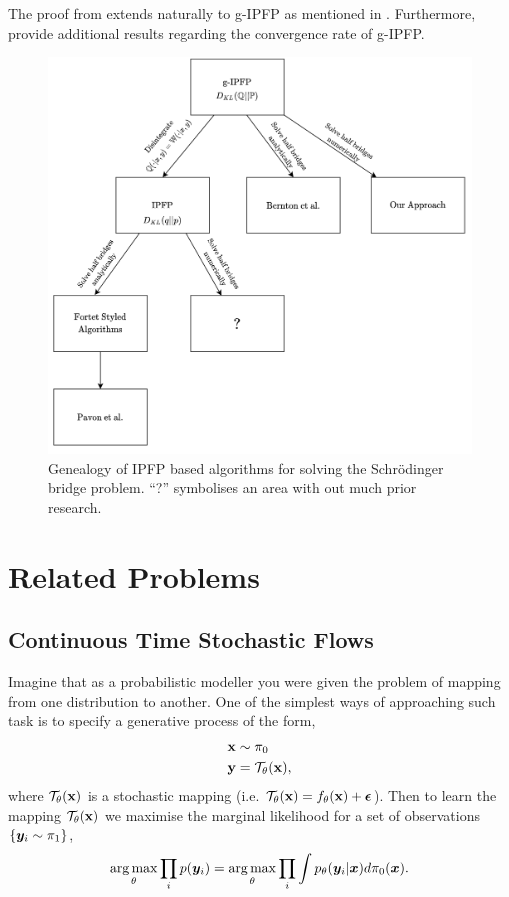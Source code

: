 \documentclass[a4paper,12pt,twoside,openright]{report}
\theoremstyle{definition}
\begin{document}
The proof from \cite{ruschendorf1995convergence} extends naturally to g-IPFP as mentioned in \cite{bernton2019schr}. Furthermore, \cite{bernton2019schr} provide additional results regarding the convergence rate of g-IPFP.
\begin{figure}[h!]
    \centering
    \includegraphics[width=\linewidth]{images/IPFP_Geanology.png}
    \caption{Genealogy of IPFP based algorithms for solving the Schrödinger bridge problem. ``?'' symbolises an area with out much prior research. }
    \label{fig:genealogy}
\end{figure}

\chapter{Related Problems}
\section{Continuous Time Stochastic Flows}

Imagine that as a probabilistic modeller you were given the problem of mapping from one distribution to another. One of the simplest ways of approaching such task is to specify a generative process of the form,
\begin{align*}
    {\mathbf{x}} &\sim \pi_0 \\
    {\mathbf{y}} &= {\mathcal{T}}_{\theta}({\mathbf{x}}),
\end{align*}
where ${\mathcal{T}}_{\theta}({\mathbf{x}})$  is a stochastic mapping (i.e. ${\mathcal{T}}_{\theta}({\mathbf{x}}) = f_{\theta}({\mathbf{x}}) + {\bm{\epsilon}}$). Then to learn the mapping ${\mathcal{T}}_{\theta}({\mathbf{x}})$  we maximise the marginal likelihood for a set of observations $\{{\bm{y}}_i \sim \pi_1 \}$,
\begin{align*}
   \operatorname*{arg\,max}_{\theta} \prod_i p({\bm{y}}_i) = \operatorname*{arg\,max}_{\theta} \prod_i \int p_{\theta}({\bm{y}}_i | {\bm{x}}) d\pi_0({\bm{x}}).
\end{align*}
\end{document}
